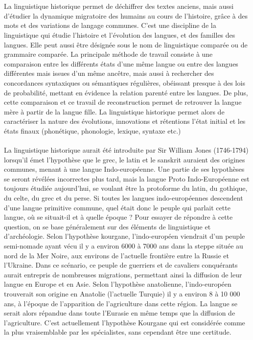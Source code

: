 \documentclass[12pt, french, twoside]{report}
\begin{document}
 \\ \\ 
 \indent La linguistique historique permet de déchiffrer des textes anciens, mais aussi d'étudier la dynamique migratoire des humains au cours de l'histoire, grâce à des mots et des variations de langage communes. C'est une discipline de la linguistique qui étudie l'histoire et l'évolution des langues, et des familles des langues. Elle peut aussi être désignée sous le nom de linguistique comparée ou de grammaire comparée. La principale méthode de travail consiste à une comparaison entre les différents états d'une même langue ou entre des langues différentes mais issues d'un même ancêtre, mais aussi à rechercher des concordances syntaxiques ou sémantiques régulières, obéissant presque à des lois de probabilité, mettant en évidence la relation parenté entre les langues. De plus, cette comparaison et ce travail de reconstruction permet de retrouver la langue mère à partir de la langue fille. La linguistique historique permet alors de caractériser la nature des évolutions, innovations et rétentions l'état initial et les états finaux (phonétique, phonologie, lexique, syntaxe etc.)
\\ \\
\indent La linguistique historique aurait été introduite par Sir William Jones (1746-1794) lorsqu'il émet l'hypothèse que le grec, le latin et le sanskrit auraient des origines communes, menant à une langue Indo-européenne. Une partie de ses hypothèses se seront révélées incorrectes plus tard, mais la langue Proto Indo-Européenne est toujours étudiée aujourd'hui, se voulant être la protoforme du latin, du gothique, du celte, du grec et du perse.  
Si toutes les langues indo-européennes descendent d'une langue primitive commune, quel était donc le peuple qui parlait cette langue, où se situait-il et à quelle époque ? Pour  essayer de répondre à cette question, on se base généralement sur des éléments de linguistique et d'archéologie. 
Selon l'hypothèse kourgane, l'indo-européen viendrait d'un peuple semi-nomade ayant vécu il y a environ 6000 à 7000 ans dans la steppe située au nord de la Mer Noire, aux environs de  l'actuelle frontière entre la Russie et l'Ukraine. Dans ce scénario, ce peuple de guerriers et de cavaliers conquérants aurait entrepris de nombreuses migrations, permettant ainsi la diffusion de leur langue en Europe et en Asie.
Selon l'hypothèse anatolienne, l'indo-européen trouverait son origine en Anatolie (l'actuelle  Turquie) il y a environ 8 à 10 000 ans, à l'époque de l'apparition de l'agriculture dans cette  région. La langue se serait alors répandue dans toute l'Eurasie en même temps que la  diffusion de l'agriculture.
C'est actuellement l'hypothèse Kourgane qui est considérée comme la plus  vraisemblable par les spécialistes, sans cependant être une certitude.
\end{document}
